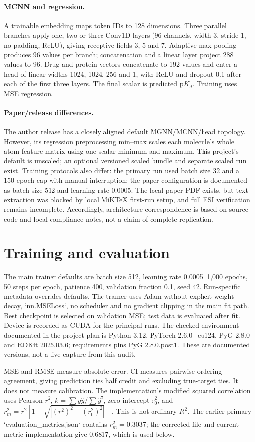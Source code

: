 \paragraph{MCNN and regression.} A trainable embedding maps token IDs to 128 dimensions. Three parallel branches apply one, two or three Conv1D layers (96 channels, width 3, stride 1, no padding, ReLU), giving receptive fields 3, 5 and 7. Adaptive max pooling produces 96 values per branch; concatenation and a linear layer project 288 values to 96. Drug and protein vectors concatenate to 192 values and enter a head of linear widths 1024, 1024, 256 and 1, with ReLU and dropout 0.1 after each of the first three layers. The final scalar is predicted p$K_d$. Training uses MSE regression.

\paragraph{Paper/release differences.} The author release has a closely aligned default MGNN/MCNN/head topology. However, its regression preprocessing min--max scales each molecule’s whole atom-feature matrix using one scalar minimum and maximum. This project’s default is unscaled; an optional versioned scaled bundle and separate scaled run exist. Training protocols also differ: the primary run used batch size 32 and a 150-epoch cap with manual interruption; the paper configuration is documented as batch size 512 and learning rate 0.0005. The local paper PDF exists, but text extraction was blocked by local MiKTeX first-run setup, and full ESI verification remains incomplete. Accordingly, architecture correspondence is based on source code and local compliance notes, not a claim of complete replication.

\section{Training and evaluation}
The main trainer defaults are batch size 512, learning rate 0.0005, 1,000 epochs, 50 steps per epoch, patience 400, validation fraction 0.1, seed 42. Run-specific metadata overrides defaults. The trainer uses Adam without explicit weight decay, `nn.MSELoss`, no scheduler and no gradient clipping in the main fit path. Best checkpoint is selected on validation MSE; test data is evaluated after fit. Device is recorded as CUDA for the principal runs. The checked environment documented in the project plan is Python 3.12, PyTorch 2.6.0+cu124, PyG 2.8.0 and RDKit 2026.03.6; requirements pins PyG 2.8.0.post1. These are documented versions, not a live capture from this audit.

MSE and RMSE measure absolute error. CI measures pairwise ordering agreement, giving prediction ties half credit and excluding true-target ties. It does not measure calibration. The implementation’s modified squared correlation uses Pearson $r^2$, $k=\sum y\hat y/\sum\hat y^2$, zero-intercept $r_0^2$, and $r_m^2=r^2[1-\sqrt{|(r^2)^2-(r_0^2)^2|}]$ \citep{roy2009}. This is not ordinary $R^2$. The earlier primary `evaluation_metrics.json` contains $r_m^2=0.3037$; the corrected file and current metric implementation give 0.6817, which is used below.

